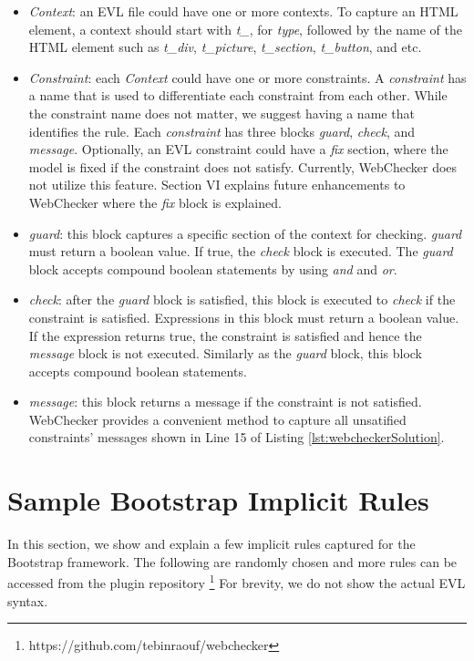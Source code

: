 \documentclass[conference]{IEEETran}
\begin{document}
\begin{itemize}
\item \textit{Context}: an EVL file could have one or more contexts. To capture an HTML element, a context should start with \textit{t\_}, for \textit{type}, followed by the name of the HTML element such as \textit{t\_div}, \textit{t\_picture}, \textit{t\_section}, \textit{t\_button}, and etc.
\item \textit{Constraint}: each \textit{Context} could have one or more constraints. A \textit{constraint} has a name that is used to differentiate each constraint from each other. While the constraint name does not matter, we suggest having a name that identifies the rule. Each \textit{constraint} has three blocks \textit{guard}, \textit{check}, and \textit{message}. Optionally, an EVL constraint could have a \textit{fix} section, where the model is fixed if the constraint does not satisfy. Currently, WebChecker does not utilize this feature. Section VI explains future enhancements to WebChecker where the \textit{fix} block is explained. 
\item \textit{guard}: this block captures a specific section of the context for checking. \textit{guard} must return a boolean value. If true, the \textit{check} block is executed. The \textit{guard} block accepts compound boolean statements by using \textit{and} and \textit{or}.      
\end{itemize}
\begin{itemize}
\item \textit{check}: after the \textit{guard} block is satisfied, this block is executed to \textit{check} if the constraint is satisfied. Expressions in this block must return a boolean value. If the expression returns true, the constraint is satisfied and hence the \textit{message} block is not executed. Similarly as the \textit{guard} block, this block accepts compound boolean statements.
\item \textit{message}: this block returns a message if the constraint is not satisfied. WebChecker provides a convenient method to capture all unsatified constraints' messages shown in Line 15 of Listing \ref{lst:webcheckerSolution}.  
\end{itemize}



\section{Sample Bootstrap Implicit Rules}
In this section, we show and explain a few implicit rules captured for the Bootstrap framework. The following are randomly chosen and more rules can be accessed from the plugin repository \footnote{https://github.com/tebinraouf/webchecker} For brevity, we do not show the actual EVL syntax.
  
\end{document}
